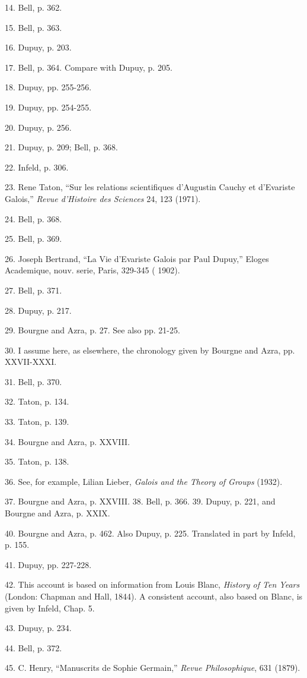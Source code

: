 \documentclass[12pt]{article}
\begin{document}
14. Bell, p. 362. 

15. Bell, p. 363. 

16. Dupuy, p. 203. 

17. Bell, p. 364. Compare with Dupuy, p. 205. 

18. Dupuy, pp. 255-256. 

19. Dupuy, pp. 254-255. 

20. Dupuy, p. 256. 

21. Dupuy, p. 209; Bell, p. 368. 

22. Infeld, p. 306. 

23. Rene Taton, ``Sur les relations scientifiques d'Augustin Cauchy et d'Evariste Galois,'' \emph{Revue d'Histoire des
Sciences} 24, 123 (1971). 

24. Bell, p. 368. 

25. Bell, p. 369. 

26. Joseph Bertrand, ``La Vie d'Evariste Galois par Paul Dupuy,'' Eloges Academique, nouv. serie, Paris, 329-345 (
1902). 

27. Bell, p. 371. 

28. Dupuy, p. 217. 

29. Bourgne and Azra, p. 27. See also pp. 21-25. 

30. I assume here, as elsewhere, the chronology given by Bourgne and Azra, pp. XXVII-XXXI. 

31. Bell, p. 370. 

32. Taton, p. 134. 

33. Taton, p. 139. 

34. Bourgne and Azra, p. XXVIII. 

35. Taton, p. 138. 

36. See, for example, Lilian Lieber, \emph{Galois and the Theory of Groups} (1932).

37. Bourgne and Azra, p. XXVIII. 38. Bell, p. 366. 39. Dupuy, p. 221, and Bourgne and Azra, p. XXIX.

40. Bourgne and Azra, p. 462. Also Dupuy, p. 225. Translated in part by Infeld, p. 155. 

41. Dupuy, pp. 227-228. 

42. This account is based on information from Louis Blanc, \emph{History of Ten Years} (London: Chapman and Hall, 1844). A
consistent account, also based on Blanc, is given by Infeld, Chap. 5. 

43. Dupuy, p. 234. 

44. Bell, p. 372. 

45. C. Henry, ``Manuscrits de Sophie Germain,'' \emph{Revue Philosophique}, 631 (1879). 
\end{document}
